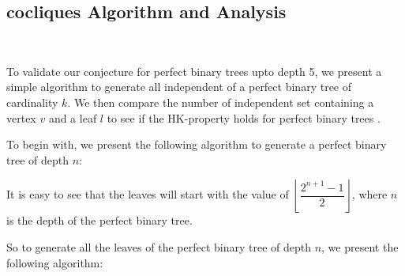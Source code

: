 \documentclass[10pt]{amsart}
\theoremstyle{definition}
\begin{document}
\begin{appendix}
	\section{cocliques Algorithm and Analysis}\label{coclique-algorithm}
	$ $

	To validate our conjecture for perfect binary trees upto depth 5, we present a simple algorithm to generate all independent of a perfect binary tree of cardinality $k$. We then compare the number of independent set containing a vertex $v$ and a leaf $l$ to see if the HK-property holds for perfect binary trees \cite{Maharjan_Exploring_Perfect_Binary}.

	To begin with, we present the following algorithm to generate a perfect binary tree of depth $n$:



	\begin{algorithm}[hbt!]
		\caption{Perfect Binary Tree Generator}\label{alg:tree-generator}


	\end{algorithm}

	It is easy to see that the leaves will start with the value of $\left\lfloor\dfrac{2^{n + 1} - 1}{2}\right\rfloor$, where $n$ is the depth of the perfect binary tree.

	So to generate all the leaves of the perfect binary tree of depth $n$, we present the following algorithm:

	\begin{algorithm}[hbt!]
		\caption{Perfect Binary Tree Leaves Generator}\label{alg:leaves-generator}



\end{algorithm}
\end{appendix}
\end{document}
